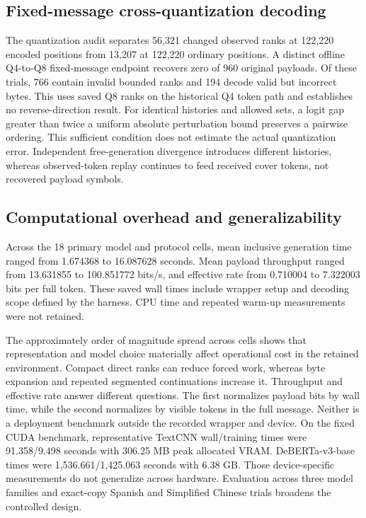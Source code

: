 \documentclass[fleqn,10pt]{wlscirep}
\begin{document}
\subsection*{Fixed-message cross-quantization decoding}\label{sec:v4-quant-results}
The quantization audit separates 56,321 changed observed ranks at 122,220 encoded positions from 13,207 at 122,220 ordinary positions. A distinct offline Q4-to-Q8 fixed-message endpoint recovers zero of 960 original payloads. Of these trials, 766 contain invalid bounded ranks and 194 decode valid but incorrect bytes. This uses saved Q8 ranks on the historical Q4 token path and establishes no reverse-direction result. For identical histories and allowed sets, a logit gap greater than twice a uniform absolute perturbation bound preserves a pairwise ordering. This sufficient condition does not estimate the actual quantization error. Independent free-generation divergence introduces different histories, whereas observed-token replay continues to feed received cover tokens, not recovered payload symbols.


\subsection*{Computational overhead and generalizability}\label{sec:results-overhead}

Across the 18 primary model and protocol cells, mean inclusive generation time ranged from 1.674368 to 16.087628 seconds. Mean payload throughput ranged from 13.631855 to 100.851772 bits/s, and effective rate from 0.710004 to 7.322003 bits per full token. These saved wall times include wrapper setup and decoding scope defined by the harness. CPU time and repeated warm-up measurements were not retained.

The approximately order of magnitude spread across cells shows that representation and model choice materially affect operational cost in the retained environment. Compact direct ranks can reduce forced work, whereas byte expansion and repeated segmented continuations increase it. Throughput and effective rate answer different questions. The first normalizes payload bits by wall time, while the second normalizes by visible tokens in the full message. Neither is a deployment benchmark outside the recorded wrapper and device.
On the fixed CUDA benchmark, representative TextCNN wall/training times were 91.358/9.498 seconds with 306.25 MB peak allocated VRAM. DeBERTa-v3-base times were 1,536.661/1,425.063 seconds with 6.38 GB. Those device-specific measurements do not generalize across hardware. Evaluation across three model families and exact-copy Spanish and Simplified Chinese trials broadens the controlled design.%
\end{document}
